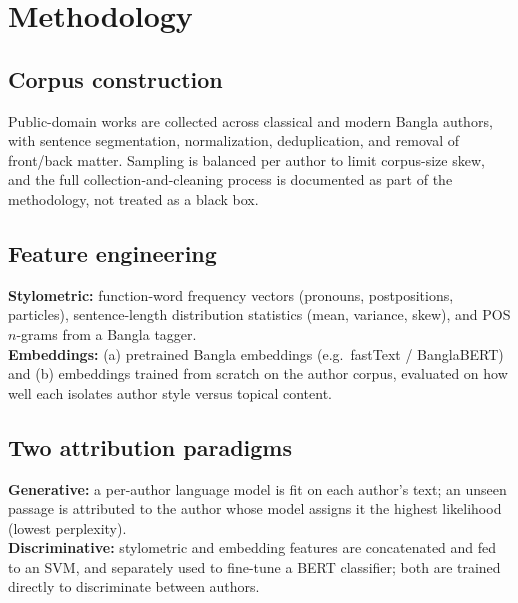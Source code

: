 \documentclass[11pt]{article}
\begin{document}
\section{Methodology}

\subsection{Corpus construction}
Public-domain works are collected across classical and modern Bangla authors, with sentence segmentation, normalization, deduplication, and removal of front/back matter. Sampling is balanced per author to limit corpus-size skew, and the full collection-and-cleaning process is documented as part of the methodology, not treated as a black box.

\subsection{Feature engineering}
\textbf{Stylometric:} function-word frequency vectors (pronouns, postpositions, particles), sentence-length distribution statistics (mean, variance, skew), and POS $n$-grams from a Bangla tagger.\\
\textbf{Embeddings:} (a) pretrained Bangla embeddings (e.g.\ fastText / BanglaBERT) and (b) embeddings trained from scratch on the author corpus, evaluated on how well each isolates author style versus topical content.

\subsection{Two attribution paradigms}
\textbf{Generative:} a per-author language model is fit on each author's text; an unseen passage is attributed to the author whose model assigns it the highest likelihood (lowest perplexity).\\
\textbf{Discriminative:} stylometric and embedding features are concatenated and fed to an SVM, and separately used to fine-tune a BERT classifier; both are trained directly to discriminate between authors.
\end{document}
